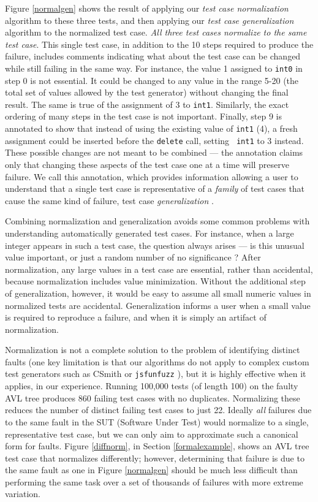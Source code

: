 Figure \ref{normalgen} shows the result of applying our \emph{test case
  normalization} algorithm to these three tests, and then applying our
\emph{test case generalization} algorithm to the normalized test case.
\emph{All three test cases normalize to the same test
case}.  This single test case, in addition to the 10 steps required to produce
the failure, includes comments indicating what about the test case can
be changed while still failing in the same way.  For instance, the
value 1 assigned to {\tt int0} in step 0 is not essential.  It could
be changed to any value in the range 5-20 (the total set of values
allowed by the test generator) without changing the final result.  The
same is true of the assignment of 3 to {\tt int1}.  Similarly, the
exact ordering of many steps in the test case is not important.  Finally,
step 9 is annotated to show that instead of using the existing value
of {\tt int1} (4), a fresh assignment could be inserted before the
{\tt delete} call, setting {\tt
  int1} to 3 instead.  These possible
changes are not meant to be combined --- the annotation claims only
that changing these aspects of the test case one at a time will
preserve failure.  We call this annotation, which provides information
allowing a user to understand that a single test case is
representative of a \emph{family} of test cases that cause the same
kind of failure, test case \emph{generalization} \cite{SmartCheck}.

Combining normalization and generalization avoids some common problems
with understanding automatically generated test cases.  For instance,
when a large integer appears in such a test case, the question always
arises --- is this unusual value important, or just a random number of
no significance \cite{MakeMost}?  After normalization, any large
values in a test case are essential, rather than
accidental, because normalization includes value minimization.
Without the additional step of generalization, however, it would be
easy to assume all small numeric values in normalized
tests are accidental.  Generalization informs a user when a small
value is required to reproduce a failure, and when it is simply an
artifact of normalization.

Normalization is not a complete solution to the problem of identifying
distinct faults (one key limitation is that our algorithms do not
apply to complex custom test generators such as CSmith \cite{csmith}
or {\tt jsfunfuzz} \cite{jsfunfuzz}), but it is highly effective when
it applies, in our experience.  Running 100,000 tests (of length 100)
on the faulty AVL tree produces 860 failing test cases with no
duplicates.  Normalizing these reduces the number of distinct failing
test cases to just 22.  Ideally \emph{all} failures due to the same
fault in the SUT (Software Under Test) would normalize to a single,
representative test case, but we can only aim to approximate such a
canonical form for faults.  Figure \ref{diffnorm}, in Section
\ref{formalexample}, shows an AVL tree test case that normalizes
differently; however, determining that failure is due to the same fault
as one in Figure \ref{normalgen} should be much less difficult than
performing the same task over a set of thousands of failures with more
extreme variation.

